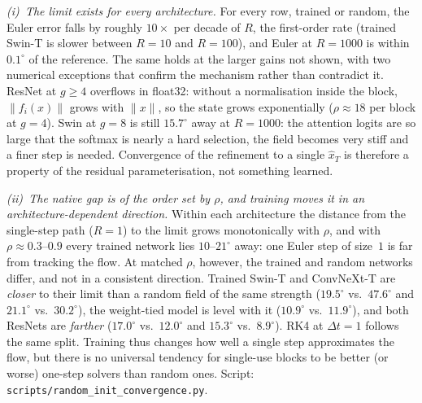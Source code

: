 \emph{(i)~The limit exists for every architecture.}
For every row, trained or random, the Euler error falls by roughly $10\times$ per
decade of $R$, the first-order rate (trained Swin-T is slower between $R{=}10$ and
$R{=}100$), and Euler at $R{=}1000$ is within $0.1^\circ$ of the reference.
The same holds at the larger gains not shown, with two numerical exceptions that
confirm the mechanism rather than contradict it.
ResNet at $g\ge4$ overflows in float32: without a normalisation inside the block,
$\|f_i(x)\|$ grows with $\|x\|$, so the state grows exponentially ($\rho\approx18$ per block at
$g{=}4$).
Swin at $g{=}8$ is still $15.7^\circ$ away at $R{=}1000$: the attention logits are so large
that the softmax is nearly a hard selection, the field becomes very stiff and a finer
step is needed.
Convergence of the refinement to a single $\hat x_T$ is therefore a property of the
residual parameterisation, not something learned.

\emph{(ii)~The native gap is of the order set by $\rho$, and training moves it in an
architecture-dependent direction.}
Within each architecture the distance from the single-step path ($R{=}1$) to the limit
grows monotonically with $\rho$, and with $\rho\approx0.3$--$0.9$ every trained network
lies $10$--$21^\circ$ away: one Euler step of size~$1$ is far from tracking the flow.
At matched $\rho$, however, the trained and random networks differ, and not in a
consistent direction.
Trained Swin-T and ConvNeXt-T are \emph{closer} to their limit than a random field of the
same strength ($19.5^\circ$ vs.\ $47.6^\circ$ and $21.1^\circ$ vs.\ $30.2^\circ$), the
weight-tied model is level with it ($10.9^\circ$ vs.\ $11.9^\circ$), and both ResNets are
\emph{farther} ($17.0^\circ$ vs.\ $12.0^\circ$ and $15.3^\circ$ vs.\ $8.9^\circ$).
RK4 at $\Delta t{=}1$ follows the same split.
Training thus changes how well a single step approximates the flow, but there is no
universal tendency for single-use blocks to be better (or worse) one-step solvers than
random ones.
Script: \texttt{scripts/random\_init\_convergence.py}.
